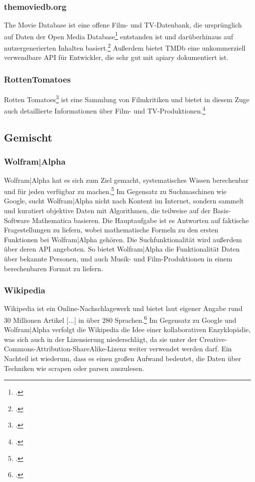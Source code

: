 \subsubsection{themoviedb.org}
The Movie Database ist eine offene Film- und TV-Datenbank, die ursprünglich auf Daten der Open Media Database\footcite{omdb} entstanden ist und darüberhinaus auf nutzergenerierten Inhalten basiert.\footcite[Vgl.][]{tmbd} Außerdem bietet TMDb eine unkommerziell verwendbare API für Entwickler, die sehr gut mit apiary dokumentiert ist.

\subsubsection{RottenTomatoes}
Rotten Tomatoes\footcite{rottenTomatoes} ist eine Sammlung von Filmkritiken und bietet in diesem Zuge auch detaillierte Informationen über Film- und TV-Produktionen.\footcite[Vgl.][]{rottenWiki} 

\subsection{Gemischt}
\subsubsection{Wolfram|Alpha}
Wolfram|Alpha hat es sich zum Ziel gemacht, systematisches Wissen berechenbar und für jeden verfügbar zu machen.\footcite[Vgl.][]{wolframAbout} Im Gegensatz zu Suchmaschinen wie Google, sucht Wolfram|Alpha nicht nach Kontent im Internet, sondern sammelt und kuratiert objektive Daten mit Algorithmen, die teilweise auf der Basis-Software Mathematica basieren. Die Hauptaufgabe ist es Antworten auf faktische Fragestellungen zu liefern, wobei mathematische Formeln zu den ersten Funktionen bei Wolfram|Alpha gehören. Die Suchfunktionalität wird außerdem über deren API angeboten. So bietet Wolfram|Alpha \zB die Funktionalität Daten über bekannte Personen, und \ua auch Musik- und Film-Produktionen in einem berechenbaren Format zu liefern.

\subsubsection{Wikipedia}
Wikipedia ist ein Online-Nachschlagewerk und bietet laut eigener Angabe \glqq rund 30 Millionen Artikel [...] in über 280 Sprachen\grqq .\footcite[Vgl.][]{wikiWiki} Im Gegensatz zu Google und Wolfram|Alpha verfolgt die Wikipedia die Idee einer kollaborativen Enzyklopädie, was sich auch in der Lizensierung niederschlägt, da sie unter der Creative-Commons-Attribution-ShareAlike-Lizenz weiter verwendet werden darf. Ein Nachteil ist wiederum, dass es einen großen Aufwand bedeutet, die Daten über Techniken wie scrapen oder parsen auszulesen.


